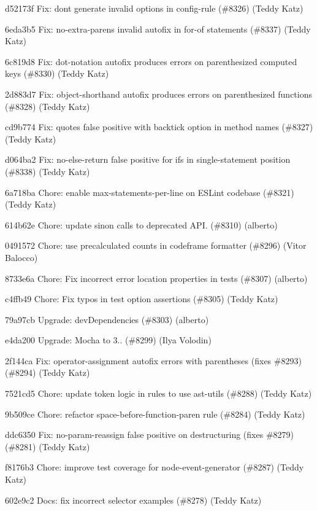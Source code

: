 \begin{DoxyItemize}
\item d52173f Fix\+: don\textquotesingle{}t generate invalid options in config-\/rule (\#8326) (Teddy Katz)
\item 6eda3b5 Fix\+: no-\/extra-\/parens invalid autofix in for-\/of statements (\#8337) (Teddy Katz)
\item 6c819d8 Fix\+: dot-\/notation autofix produces errors on parenthesized computed keys (\#8330) (Teddy Katz)
\item 2d883d7 Fix\+: object-\/shorthand autofix produces errors on parenthesized functions (\#8328) (Teddy Katz)
\item cd9b774 Fix\+: quotes false positive with backtick option in method names (\#8327) (Teddy Katz)
\item d064ba2 Fix\+: no-\/else-\/return false positive for ifs in single-\/statement position (\#8338) (Teddy Katz)
\item 6a718ba Chore\+: enable max-\/statements-\/per-\/line on E\+S\+Lint codebase (\#8321) (Teddy Katz)
\item 614b62e Chore\+: update sinon calls to deprecated A\+PI. (\#8310) (alberto)
\item 0491572 Chore\+: use precalculated counts in codeframe formatter (\#8296) (Vitor Balocco)
\item 8733e6a Chore\+: Fix incorrect error location properties in tests (\#8307) (alberto)
\item c4ffb49 Chore\+: Fix typos in test option assertions (\#8305) (Teddy Katz)
\item 79a97cb Upgrade\+: dev\+Dependencies (\#8303) (alberto)
\item e4da200 Upgrade\+: Mocha to 3.. (\#8299) (Ilya Volodin)
\item 2f144ca Fix\+: operator-\/assignment autofix errors with parentheses (fixes \#8293) (\#8294) (Teddy Katz)
\item 7521cd5 Chore\+: update token logic in rules to use ast-\/utils (\#8288) (Teddy Katz)
\item 9b509ce Chore\+: refactor space-\/before-\/function-\/paren rule (\#8284) (Teddy Katz)
\item ddc6350 Fix\+: no-\/param-\/reassign false positive on destructuring (fixes \#8279) (\#8281) (Teddy Katz)
\item f8176b3 Chore\+: improve test coverage for node-\/event-\/generator (\#8287) (Teddy Katz)
\item 602e9c2 Docs\+: fix incorrect selector examples (\#8278) (Teddy Katz)
\end{DoxyItemize}

